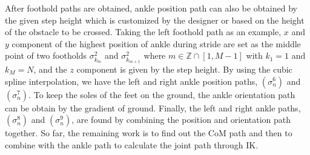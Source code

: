 \documentclass{ieeeaccess}
\begin{document}
After foothold paths are obtained, ankle position path can also be obtained by the given step height which is customized by the designer or based on the height of the obstacle to be crossed. Taking the left foothold path as an example, $x$ and $y$ component of the highest position of ankle during stride are set as the middle point of two footholds $\sigma^{2}_{k_m}$ and $\sigma^{2}_{k_{m+1}}$ where $m\in\mathbb{Z}\cap[1,M-1]$ with $k_1 = 1$ and $k_M = N$, and the $z$ component is given by the step height. By using the cubic spline interpolation, we have the left and right ankle position paths, $(\sigma^{6}_{n})$ and $(\sigma^{7}_{n})$. To keep the soles of the feet on the ground, the ankle orientation path can be obtain by the gradient of ground. Finally, the left and right ankle paths, $(\sigma^{8}_{n})$ and $(\sigma^{9}_{n})$, are found by combining the position and orientation path together. So far, the remaining work is to find out the CoM path and then to combine with the ankle path to calculate the joint path through IK.
\end{document}
